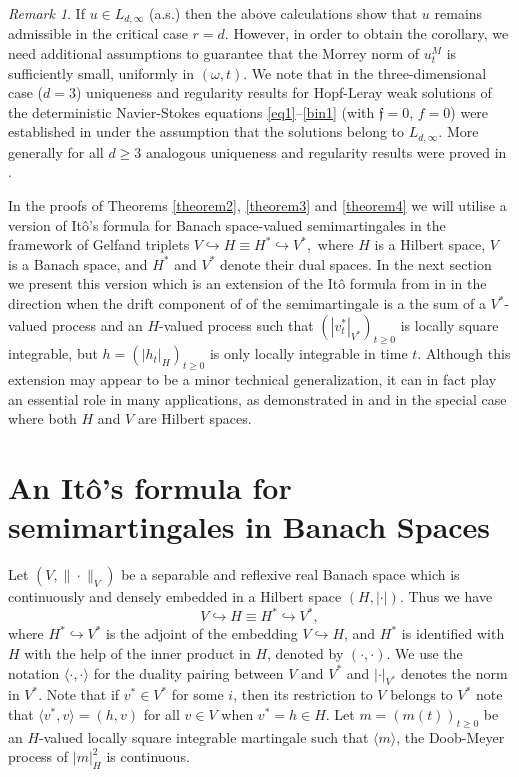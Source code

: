 \documentclass[11pt,reqno]{amsart}
\newcommand{\mysection}[1]{\section{#1}

      \setcounter{equation}{0}}
\theoremstyle{definition}
\theoremstyle{remark}
\newtheorem{remark}{Remark}[section]
\newcommand\frf{\mathfrak{f}}
\newcommand{\<}{\langle}
\renewcommand{\>}{\rangle}
\begin{document}
\begin{remark}
 If $u\in L_{d,\infty}$ (a.s.) 
 then the above calculations show that $u$ remains admissible 
in the critical case  $r=d$. However, in order to obtain the corollary, 
we need additional assumptions to guarantee that the Morrey 
norm of $u^M_t$ is sufficiently small, uniformly 
in $(\omega,t)$.  We note that in the three-dimensional case ($d=3$)  uniqueness 
and regularity results 
for Hopf-Leray weak solutions of the  
deterministic Navier-Stokes equations \eqref{eq1}--\eqref{bin1} 
(with $\frf=0$, $f=0$) were established in \cite{ESS2003} under the assumption that 
the solutions belong to $L_{d,\infty}$. More generally for all $d\geq3$ 
analogous uniqueness and regularity results were proved in \cite{DoDa2009}.  
\end{remark}
 
In the proofs of Theorems \ref{theorem2}, \ref{theorem3} and \ref{theorem4}
we will utilise a version of It\^o's formula for 
Banach space-valued semimartingales in the framework of Gelfand triplets
$
V \hookrightarrow H \equiv H^{\ast} \hookrightarrow V^{\ast},
$
where $H$ is a Hilbert space, $V$ is a Banach space, 
and $H^\ast$ and $V^\ast$ denote their dual spaces. 
In the next section we present this version which is an extension 
of the It\^o formula 
from in \cite{GK1982} in the direction when the drift component of 
of the semimartingale is a the sum of a $V^{\ast}$-valued process 
and an $H$-valued process such that $(|v_t^{\ast}|_{V^{\ast}})_{t\geq0}$ is locally 
square integrable, but $h=(|h_t|_H)_{t\geq 0}$ is only   
locally integrable in time $t$.
Although this extension may appear to be a minor technical generalization, 
it can in fact play an essential role in many applications, 
as demonstrated in \cite{GyongyKrylov} and \cite{GK2026}   
in the special case where both $H$ and $V$ are Hilbert spaces.


\mysection{ An It\^o's formula for semimartingales in Banach Spaces}

Let $(V,\|\cdot\|_{V})$ be a separable and reflexive real Banach 
space which is continuously and densely 
embedded in a Hilbert space $(H, |\cdot|)$. Thus we have 
$$
V\hookrightarrow H\equiv H^{\ast}\hookrightarrow V^{\ast}, 
$$
where $H^{\ast}\hookrightarrow V^{\ast}$ is the adjoint of the embedding 
$V\hookrightarrow H$, and $H^{\ast}$ is identified with $H$ with the help 
of the inner product in $H$, denoted by $(\cdot,\cdot)$. 
We use the notation 
$\langle\cdot, \cdot\rangle$ for the duality pairing between $V$ and $V^{\ast}$ 
and $|\cdot|_{V^{\ast}}$ denotes the norm in $V^{\ast}$. 
Note that if $v^{\ast}\in V^{\ast}$ for some $i$, then its restriction to $V$ belongs 
to $V^{\ast}$ note that $\langle v^{\ast},v\rangle=(h,v)$   
for all $v\in V$ when $v^{\ast}=h\in H$. 
Let $m=(m(t))_{t\geq0}$ be an $H$-valued locally square integrable martingale 
such that $\langle m\rangle$, the Doob-Meyer process of $|m|^2_H$ is continuous. 
 
\end{document}
